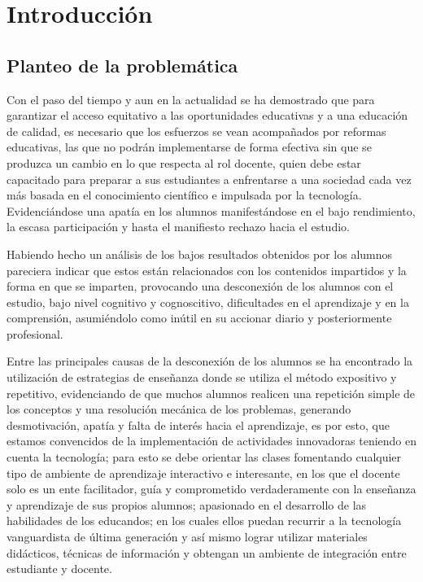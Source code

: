 \documentclass[oneside,spanish]{amsart}
\numberwithin{equation}{section}
\numberwithin{figure}{section}
\theoremstyle{definition}
\begin{document}
\section{Introducción}

\subsection{Planteo de la problemática}

Con el paso del tiempo y aun en la actualidad se ha demostrado que para garantizar el acceso equitativo a las oportunidades educativas y a una educación de calidad, es necesario que los esfuerzos se vean acompañados por reformas educativas, las que no podrán implementarse de forma efectiva sin que se produzca un cambio en lo que respecta al rol docente, quien debe estar capacitado para preparar a sus estudiantes a enfrentarse a una sociedad cada vez más basada en el conocimiento científico e impulsada por la tecnología. Evidenciándose una apatía en los alumnos manifestándose en el bajo rendimiento, la escasa participación y hasta el manifiesto rechazo hacia el estudio. 

Habiendo hecho un análisis de los bajos resultados obtenidos por los alumnos pareciera indicar que estos están relacionados con los contenidos impartidos y la forma en que se imparten, provocando una desconexión de los alumnos con el estudio, bajo nivel cognitivo y cognoscitivo, dificultades en el aprendizaje y en la comprensión, asumiéndolo como inútil en su accionar diario y posteriormente profesional. 

Entre las principales causas de la desconexión de los alumnos se ha encontrado la utilización de estrategias de enseñanza donde se utiliza el método expositivo y repetitivo, evidenciando de que muchos alumnos realicen una repetición simple de los conceptos y una resolución mecánica de los problemas, generando desmotivación, apatía y falta de interés hacia el aprendizaje, es por esto, que estamos convencidos de la implementación de actividades innovadoras teniendo en cuenta la tecnología; para esto se debe orientar las clases fomentando  cualquier tipo de ambiente de aprendizaje interactivo e interesante, en los que el docente solo es un ente facilitador, guía y comprometido verdaderamente con la enseñanza y aprendizaje de sus propios alumnos; apasionado en el desarrollo de las habilidades de los educandos; en los cuales ellos puedan recurrir a la tecnología vanguardista de última generación y así mismo lograr utilizar materiales didácticos, técnicas de información y obtengan un ambiente de integración entre estudiante y docente.
\end{document}
